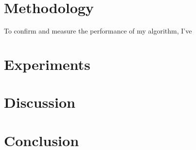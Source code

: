 \documentclass{article}
\begin{document}
\section*{Methodology}
To confirm and measure the performance of my algorithm, I've 

\section*{Experiments}
\section*{Discussion}
\section*{Conclusion}

\printbibliography
\end{document}
